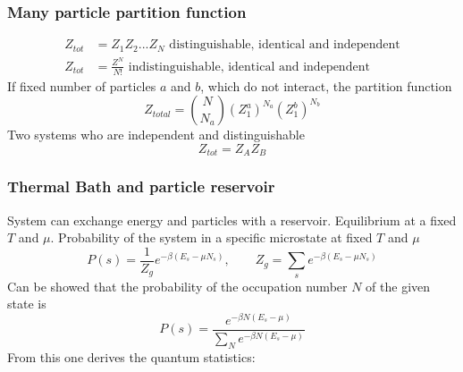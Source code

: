 \documentclass[a4paper, norsk, 8pt]{article}
\begin{document}
\begin{multicols*}{3}
\subsubsection*{\scriptsize Many particle partition function}
\begin{align*}
  Z_{tot} &= Z_1Z_2...Z_N\,\, \text{distinguishable, identical and independent}\\
  Z_{tot} &= \frac{Z^N}{N!}\,\, \text{indistinguishable, identical and independent }
\end{align*}
If fixed number of particles $a$ and $b$, which do not interact, the partition function
\begin{equation*}
  Z_{total} = \binom{N}{N_a}(Z_1^a)^{N_a}(Z_1^b)^{N_b}
\end{equation*}
Two systems who are independent and distinguishable
$$Z_{tot} = Z_AZ_B $$
\subsubsection*{\scriptsize Thermal Bath and particle reservoir}
System can exchange energy and particles with a reservoir. Equilibrium at a fixed $T$ and $\mu$. Probability of the system in a specific microstate at fixed $T$ and $\mu$
\begin{equation*}
  P(s) = \frac{1}{Z_g}e^{-\beta \left( E_s-\mu N_s \right)}, \qquad Z_g = \sum_s e^{-\beta \left(E_s-\mu N_s \right) }
\end{equation*}
Can be showed that the probability of the occupation number $N$ of the given state is
\begin{equation*}
  P(s) = \frac{e^{-\beta N \left( E_s-\mu  \right)}}{\sum_{N} e^{-\beta N \left( E_s-\mu  \right)}}
\end{equation*}
From this one derives the quantum statistics:

\end{multicols*}
\end{document}
